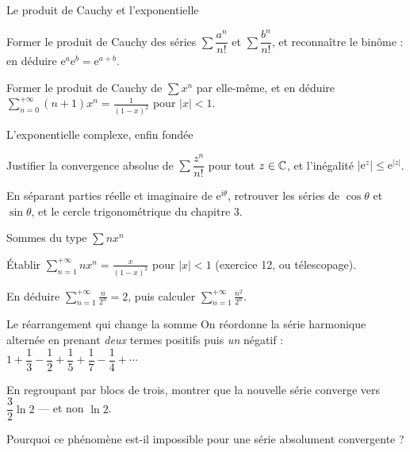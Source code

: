 \begin{exercice}[2]{Le produit de Cauchy et l'exponentielle}
\begin{questions}
  \item Former le produit de Cauchy des séries $\sum\dfrac{a^{n}}{n!}$ et
    $\sum\dfrac{b^{n}}{n!}$, et reconnaître le binôme : en déduire
    $\mathrm{e}^{a}\mathrm{e}^{b}=\mathrm{e}^{a+b}$.
  \item Former le produit de Cauchy de $\sum x^{n}$ par elle-même, et en
    déduire $\displaystyle\sum_{n=0}^{+\infty}(n+1)x^{n}
    =\frac{1}{(1-x)^{2}}$ pour $|x|<1$.
\end{questions}
\end{exercice}

\begin{exercice}[2]{L'exponentielle complexe, enfin fondée}
\begin{questions}
  \item Justifier la convergence absolue de
    $\sum\dfrac{z^{n}}{n!}$ pour tout $z\in\mathbb{C}$, et l'inégalité
    $\bigl|\mathrm{e}^{z}\bigr|\leqslant\mathrm{e}^{|z|}$.
  \item En séparant parties réelle et imaginaire de
    $\mathrm{e}^{\mathrm{i}\theta}$, retrouver les séries de
    $\cos\theta$ et $\sin\theta$, et le cercle trigonométrique du
    chapitre 3.
\end{questions}
\end{exercice}

\begin{exercice}[2]{Sommes du type $\sum n x^{n}$}
\begin{questions}
  \item Établir $\displaystyle\sum_{n=1}^{+\infty}nx^{n}
    =\frac{x}{(1-x)^{2}}$ pour $|x|<1$ (exercice 12, ou télescopage).
  \item En déduire $\displaystyle\sum_{n=1}^{+\infty}\frac{n}{2^{n}}=2$,
    puis calculer $\displaystyle\sum_{n=1}^{+\infty}\frac{n^{2}}{2^{n}}$.
\end{questions}
\end{exercice}

\begin{exercice}[2]{Le réarrangement qui change la somme}
On réordonne la série harmonique alternée en prenant \emph{deux} termes
positifs puis \emph{un} négatif :
$1+\dfrac13-\dfrac12+\dfrac15+\dfrac17-\dfrac14+\cdots$
\begin{questions}
  \item En regroupant par blocs de trois, montrer que la nouvelle série
    converge vers $\dfrac32\ln2$ — et non $\ln2$.
  \item Pourquoi ce phénomène est-il impossible pour une série
    absolument convergente ?
\end{questions}
\end{exercice}


